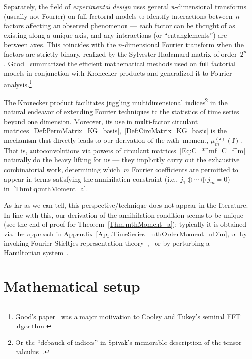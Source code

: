 \documentclass[letterpaper,11pt]{article}
\newcommand{\bs}[1]{{\boldsymbol{#1}}}
\newcommand{\gr}[1]{( #1 )}
\newcommand{\dimin}[2]{{ #1 }^{\gr{#2}}}
\newcommand{\mth}{$m$th}
\theoremstyle{definition} \newtheorem{remark}{Remark}
\begin{document}
Separately, the field of \emph{experimental design} uses general $n$-dimensional transforms (usually not Fourier) on full factorial models to identify interactions between~$n$ factors affecting an observed phenomenon --- each factor can be thought of as existing along a unique axis, and any interactions (or ``entanglements'') are between axes. This coincides with the $n$-dimensional Fourier transform when the factors are strictly binary, realized by the Sylvester-Hadamard matrix of order~$2^n$. Good~\cite{good1958interaction} summarized the efficient mathematical methods used on full factorial models in conjunction with Kronecker products and generalized it to Fourier analysis.\footnote{Good's paper~\cite{good1958interaction} was a major motivation to Cooley and Tukey's seminal FFT algorithm\cite{cooleytukey1965fft}.}

The Kronecker product facilitates juggling multidimensional indices\footnote{Or the ``debauch of indices'' in Spivak's memorable description of the tensor calculus~\cite[Ch.~5]{spivak1979comprehensive}.} in the natural endeavor of extending Fourier techniques to the statistics of time series beyond one dimension. Moreover, its use in multi-factor circulant matrices~\eqref{Def:PermMatrix_KG_basis},~\eqref{Def:CircMatrix_KG_basis} is the mechanism that directly leads to our derivation of the \mth\ moment, $\dimin{\mu}{a}_m\gr{\bs{f}}$. That is, autoconvolutions via powers of circulant matrices~\eqref{Eq:C_*^mf=C_f^m} naturally do the heavy lifting for us --- they implicitly carry out the exhaustive combinatorial work, determining which~$m$ Fourier coefficients are permitted to appear in terms satisfying the annihilation constraint (i.e., $j_1 \oplus \cdots \oplus j_m = 0$) in~\eqref{ThmEq:mthMoment_a}.

As far as we can tell, this perspective/technique does not appear in the literature.
In line with this, our derivation of the annihilation condition seems to be unique (see the end of proof for Theorem~\ref{Thm:mthMoment_a}); typically it is obtained via the approach in Appendix~\ref{App:TimeSeries_mthOrderMoment_nDim}, or by invoking Fourier-Stieltjes representation theory~\cite[Ch.~2.3.2]{nikias1993higher},~\cite[Ch.~3.2]{priestley1988nonlinearnonstationarytimeseries} or by perturbing a Hamiltonian system~\cite[Ch.~1]{morbidelli2002modernCelestialMechanics}.


\section{Mathematical setup} \label{Sec:MathSetup}
\end{document}
